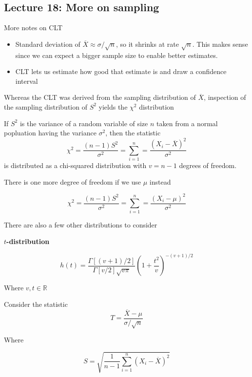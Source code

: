 \documentclass[10pt]{article}
\begin{document}
\subsection{Lecture 18: More on sampling}
More notes on CLT

\begin{itemize}
	\item Standard deviation of $ \overline{X} \approx \sigma / \sqrt{n}  $, so it shrinks at rate $ \sqrt{n}  $. This makes sense since we can expect a bigger sample size to enable better estimates. 
	\item CLT lets us estimate how good that estimate is and draw a confidence interval
\end{itemize}

Whereas the CLT was derived from the sampling distribution of $ \overline{X} $, inspection of the sampling distribution of $ S^2  $ yields the $ \chi^2 $ distribution


\begin{definition}
	If $ S^2 $ is the variance of a random variable of size $ n $  taken from a normal popluation having the variance $ \sigma^2 $, then the statistic 
	\begin{equation}
		\chi^2 = \frac{(n-1)S^2}{\sigma^2} = \sum_{i=1}^n = \frac{(X_i - \overline{X})^2}{\sigma^2} 
		\label{eq:286:chi_squared_statistic}
	\end{equation}
	is distributed as a chi-squared distribution with $ v = n-1 $ degrees of freedom.

	There is one more degree of freedom if we use $ \mu $ instead

	\begin{equation}
		\chi^2 = \frac{(n-1)S^2}{\sigma^2} = \sum_{i=1}^n = \frac{(X_i - \mu)^2}{\sigma^2} 
	\end{equation}
\end{definition}


There are also a few other distributions to consider

\begin{definition}

	\textbf{$ t $-distribution} 

	\begin{equation}
		h(t) = \frac{\Gamma[(v+1)/2]}{\Gamma[v/2]\sqrt{v\pi}} \left( 1 + \frac{t^2}{v} \right)^{-(v+1)/2}
		\label{eq:286:t_distribution}
	\end{equation}

	Where $ v, t \in \mathbb{R} $ 
	

	Consider the statistic 
	\begin{equation}
		T = \frac{\overline{X} - \mu}{\sigma/\sqrt{n}}
	\end{equation}

	Where

	\begin{equation}
		S = \sqrt{\frac{1}{n-1} \sum^n_{i=1} (X_i - \overline{X})^2}
	\end{equation}
	
\end{definition}
\end{document}
